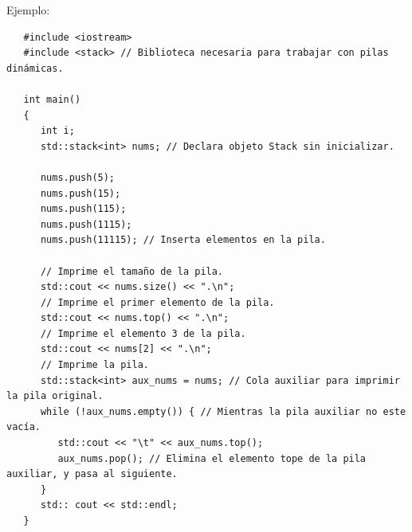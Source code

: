 Ejemplo:
\begin{lstlisting}
   #include <iostream>
   #include <stack> // Biblioteca necesaria para trabajar con pilas dinámicas.

   int main()
   {
      int i;
      std::stack<int> nums; // Declara objeto Stack sin inicializar.

      nums.push(5);
      nums.push(15);
      nums.push(115);
      nums.push(1115);
      nums.push(11115); // Inserta elementos en la pila.

      // Imprime el tamaño de la pila.
      std::cout << nums.size() << ".\n";
      // Imprime el primer elemento de la pila.
      std::cout << nums.top() << ".\n";
      // Imprime el elemento 3 de la pila.
      std::cout << nums[2] << ".\n";
      // Imprime la pila.
      std::stack<int> aux_nums = nums; // Cola auxiliar para imprimir la pila original.
      while (!aux_nums.empty()) { // Mientras la pila auxiliar no este vacía.
         std::cout << "\t" << aux_nums.top(); 
         aux_nums.pop(); // Elimina el elemento tope de la pila auxiliar, y pasa al siguiente.
      }
      std:: cout << std::endl;
   }

\end{lstlisting}